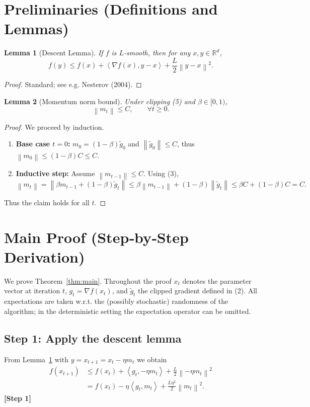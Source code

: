 \documentclass{article}
\newtheorem{lemma}{Lemma}
\newcommand{\norm}[1]{\left\lVert#1\right\rVert}
\newcommand{\inner}[2]{\left\langle #1,#2\right\rangle}
\begin{document}
\newpage
\section*{Preliminaries (Definitions and Lemmas)}
\begin{lemma}[Descent Lemma]\label{lem:descent}
If $f$ is $L$‑smooth, then for any $x,y\in\mathbb{R}^{d}$,
\[
f(y)\le f(x)+\inner{\nabla f(x)}{y-x}+\frac{L}{2}\norm{y-x}^{2}.
\]
\end{lemma}
\begin{proof}
Standard; see e.g. Nesterov (2004). \qedhere
\end{proof}
\begin{lemma}[Momentum norm bound]\label{lem:mombound}
Under clipping (5) and $\beta\in[0,1)$,
\[
\norm{m_{t}}\le C,\qquad\forall t\ge0.
\]
\end{lemma}
\begin{proof}
We proceed by induction.
\begin{enumerate}[label=\arabic*.]
\item \textbf{Base case $t=0$:}
    $m_{0}=(1-\beta)\tilde g_{0}$ and $\norm{\tilde g_{0}}\le C$,
    thus $\norm{m_{0}}\le (1-\beta)C\le C$.
\item \textbf{Inductive step:}
    Assume $\norm{m_{t-1}}\le C$.  Using (3),
    \[
    \norm{m_{t}}
    =\norm{\beta m_{t-1}+(1-\beta)\tilde g_{t}}
    \le \beta\norm{m_{t-1}}+(1-\beta)\norm{\tilde g_{t}}
    \le \beta C+(1-\beta)C=C.
    \]
\end{enumerate}
Thus the claim holds for all $t$. \qedhere
\end{proof}

\section*{Main Proof (Step‑by‑Step Derivation)}
We prove Theorem~\ref{thm:main}.  Throughout the proof $x_{t}$ denotes the
parameter vector at iteration $t$, $g_{t}=\nabla f(x_{t})$, and $\tilde g_{t}$
the clipped gradient defined in (2).  All expectations are taken w.r.t. the
(possibly stochastic) randomness of the algorithm; in the deterministic
setting the expectation operator can be omitted.

\subsection*{Step 1: Apply the descent lemma}
From Lemma~\ref{lem:descent} with $y=x_{t+1}=x_{t}-\eta m_{t}$ we obtain
\begin{align}
f(x_{t+1})
&\le f(x_{t})+\inner{g_{t}}{-\eta m_{t}}
     +\frac{L}{2}\norm{-\eta m_{t}}^{2} \nonumber\\[2pt]
&= f(x_{t})-\eta\inner{g_{t}}{m_{t}}
   +\frac{L\eta^{2}}{2}\norm{m_{t}}^{2}. \tag{7}
\end{align}
\textbf{[Step 1]}
\end{document}
